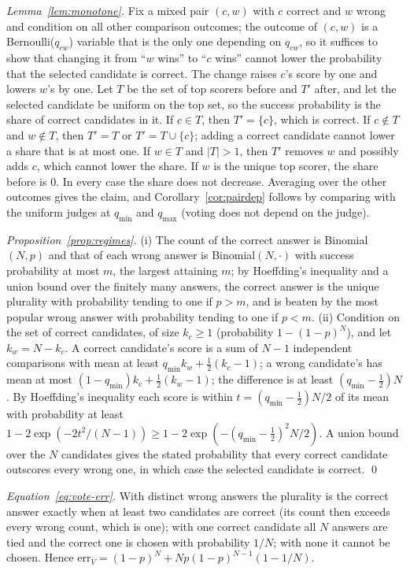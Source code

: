 \emph{Lemma~\ref{lem:monotone}.} Fix a mixed pair $(c,w)$ with $c$ correct and $w$ wrong and
condition on all other comparison outcomes; the outcome of $(c,w)$ is a
Bernoulli($q_{cw}$) variable that is the only one depending on $q_{cw}$, so it
suffices to show that changing it from ``$w$ wins'' to ``$c$ wins'' cannot lower the
probability that the selected candidate is correct. The change raises $c$'s score by one and lowers $w$'s by one.
Let $T$ be the set of top scorers before and $T'$ after, and let the selected candidate be uniform on the top set, so the success
probability is the share of correct candidates in it. If $c\in T$, then $T'=\{c\}$, which is correct. If
$c\notin T$ and $w\notin T$, then $T'=T$ or $T'=T\cup\{c\}$; adding a correct candidate cannot lower a
share that is at most one. If $w\in T$ and $|T|>1$, then $T'$ removes $w$ and possibly adds $c$, which
cannot lower the share. If $w$ is the unique top scorer, the share before is $0$. In every case the share does not decrease.
Averaging over the other outcomes gives the claim, and Corollary~\ref{cor:pairdep} follows by comparing with the uniform judges at $q_{\min}$
and $q_{\max}$ (voting does not depend on the judge).

\emph{Proposition~\ref{prop:regimes}.} (i) The count of the correct answer is Binomial$(N,p)$ and that of each wrong answer is Binomial$(N,\cdot)$ with success probability at most $m$, the largest attaining $m$; by Hoeffding's inequality and a union bound over the finitely many answers, the correct answer is the unique plurality with probability tending to one if $p>m$, and is beaten by the most popular wrong answer with probability tending to one if $p<m$. (ii) Condition on the set of correct candidates, of size $k_c\ge1$ (probability $1-(1-p)^N$), and let
$k_w=N-k_c$. A correct candidate's score is a sum of $N-1$ independent comparisons with mean at least
$q_{\min}k_w+\tfrac12(k_c-1)$; a wrong candidate's has mean at most $(1-q_{\min})k_c+\tfrac12(k_w-1)$; the
difference is at least $(q_{\min}-\tfrac12)N$. By Hoeffding's inequality each score is within
$t=(q_{\min}-\tfrac12)N/2$ of its mean with probability at least
$1-2\exp(-2t^2/(N-1))\ge1-2\exp(-(q_{\min}-\tfrac12)^2N/2)$. A union bound over the $N$ candidates gives
the stated probability that every correct candidate outscores every wrong one, in which case the selected
candidate is correct. \qed

\emph{Equation~\eqref{eq:vote-err}.} With distinct wrong answers the plurality is the correct answer exactly when
at least two candidates are correct (its count then exceeds every wrong count, which is one); with one correct candidate
all $N$ answers are tied and the correct one is chosen with probability $1/N$; with none it cannot be chosen. Hence
$\mathrm{err}_V=(1-p)^N+Np(1-p)^{N-1}(1-1/N)$.

